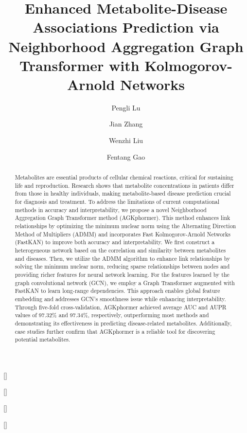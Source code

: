 \documentclass[a4paper,fleqn]{cas-dc}
\begin{document}
\let\WriteBookmarks\relax
\def\floatpagepagefraction{1}
\def\textpagefraction{.001}

\shorttitle{}    
\title [mode = title]{Enhanced Metabolite-Disease Associations Prediction via Neighborhood Aggregation Graph Transformer with Kolmogorov-Arnold Networks}  


\author[1]{Pengli Lu}[]
\cormark[1]

\author[1]{Jian Zhang}[]

\author[1]{Wenzhi Liu}[]

\author[2]{Fentang Gao}[]






\begin{abstract}
Metabolites are essential products of cellular chemical reactions, critical for sustaining life and reproduction.  Research shows that metabolite concentrations in patients differ from those in healthy individuals, making metabolite-based disease prediction crucial for diagnosis and treatment.
To address the limitations of current computational methods in accuracy and interpretability, we propose a novel Neighborhood Aggregation Graph Transformer method (AGKphormer). This method enhances link relationships by optimizing the minimum nuclear norm using the Alternating Direction Method of Multipliers (ADMM) and incorporates Fast Kolmogorov-Arnold Networks (FastKAN) to improve both accuracy and interpretability.
We first construct a heterogeneous network based on the correlation and similarity between metabolites and diseases.  Then, we utilize the ADMM algorithm to enhance link relationships by solving the minimum nuclear norm, reducing sparse relationships between nodes and providing richer features for neural network learning. For the features learned by the graph convolutional network (GCN), we employ a Graph Transformer augmented with FastKAN to learn long-range dependencies. This approach enables global feature embedding and addresses GCN's smoothness issue while enhancing interpretability.
Through five-fold cross-validation, AGKphormer achieved average AUC and AUPR values of 97.32\% and 97.34\%, respectively, outperforming most methods and demonstrating its effectiveness in predicting disease-related metabolites. Additionally, case studies further confirm that AGKphormer is a reliable tool for discovering potential metabolites.
\end{abstract}
\end{document}
